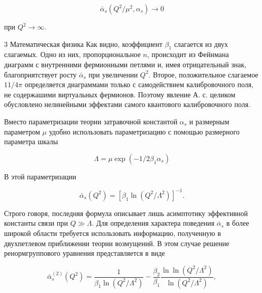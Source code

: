 \documentclass[10pt]{article}
\begin{document}
\[

\bar{\alpha}_{s}\left(Q^{2} / \mu^{2}, \alpha_{s}\right) \rightarrow 0

\]



при $Q^{2} \rightarrow \infty$.



3 Математическая физика Как видно, коэффициент $\beta_{1}$ слагается из двух слагаемых. Одно из них, пропорциональное $n$, происходит из Фейнмана диаграмм с внутренними фермионными петлями и, имея отрицательный знак, благоприятствует росту $\bar{\alpha}_{s}$ при увеличении $Q^{2}$. Второе, положительное слагаемое $11 / 4 \pi$ определяется диаграммами только с самодействием калибровочного поля, не содержашими виртуальных фермионов. Поэтому явление А. с. целиком обусловлено нелинейными эффектами самого квантового калибровочного поля.



Вместо параметризации теории затравочной константой $\alpha_{s}$ и размерным параметром $\mu$ удобно использовать параметризацию с помощью размерного параметра шкалы



\[

\Lambda=\mu \exp \left(-1 / 2 \beta_{1} \alpha_{s}\right)

\]



В этой параметризации



\[

\bar{\alpha}_{s}\left(Q^{2}\right)=\left[\beta_{1} \ln \left(Q^{2} / \Lambda^{2}\right)\right]^{-1} .

\]



Строго говоря, последняя формула описывает лишь асимптотику эффективной константы связи при $Q \gg \Lambda$. Для определения характера поведения $\bar{\alpha}_{s}$ в более широкой области требуется использовать информацию, полученную в двухпетлевом приближении теории возмущений. В этом случае решение ренормгруппового уравнения представляется в виде



\[

\bar{\alpha}_{s}^{(2)}\left(Q^{2}\right)=\frac{1}{\beta_{1} \ln \left(Q^{2} / \Lambda^{2}\right)}-\frac{\beta_{2}}{\beta_{1}} \frac{\ln \ln \left(Q^{2} / \Lambda^{2}\right)}{\ln \left(Q^{2} / \Lambda^{2}\right)},

\]
\end{document}
